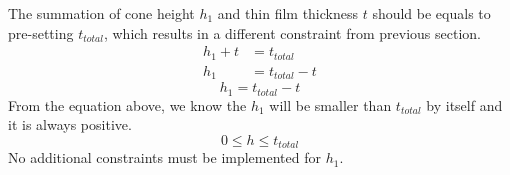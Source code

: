 \documentclass[12pt]{article}
\numberwithin{equation}{section}
\numberwithin{equation}{section}
\begin{document}
The summation of cone height $h_1$ and thin film thickness $t$ should be equals to pre-setting $t_{total}$, which results in a different constraint from previous section.
\begin{align}
 h_{1} + t &= t_{total} \nonumber \\
 h_{1} &= t_{total}-t 
 \end{align}
 \begin{equation}
 \boxed{h_1 = t_{total} - t}
 \end{equation}
From the equation above, we know the $h_1$ will be smaller than $t_{total}$ by itself and it is always positive. 
\begin{equation}
0 \leq h \leq t_{total}
\end{equation}
No additional constraints must be implemented for $h_1$.  \\
\end{document}
